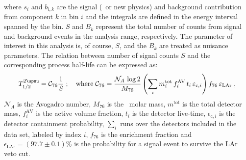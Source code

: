where $s_i$ and $b_{i,k}$ are the signal (\nnbb\ or new physics) and background
contribution from component $k$ in bin $i$ and the integrals are defined in the energy
interval spanned by the bin. $S$ and $B_k$ represent the total number of counts from
signal and background events in the analysis range, respectively. The parameter of
interest in this analysis is, of course, $S$, and the $B_k$ are treated as nuisance
parameters. The relation between number of signal counts $S$ and the corresponding process
half-life can be expressed as:
\begin{equation}\label{eq:2nbb-ana:halflife}
  \thalftwoM = \mathcal{C}_{76} \frac{1}{S}\;;\quad
    \text{where}\; \mathcal{C}_{76} = \frac{\mathcal{N}_A\, \log2}{M_{76}}
      \left( \sum_i m^\text{tot}_i \, f^\text{AV}_i \, t_i \,
      \epsilon_{\text{c},i} \right) f_{76} \, \epsilon_\text{LAr} \;,
\end{equation}
$\mathcal{N}_A$ is the Avogadro number, $M_{76}$ is the \gesix\ molar mass,
$m^\text{tot}$ is the total detector mass, $f^\text{AV}_i$ is the active volume fraction,
$t_i$ is the detector live-time, $\epsilon_{\text{c},i}$ is the detector containment
probability, $\sum_i$ runs over the detectors included in the data set, labeled by index
$i$, $f_{76}$ is the enrichment fraction and $\epsilon_\text{LAr} = (97.7 \pm 0.1)\%$ is
the probability for a signal event to survive the LAr veto cut.

